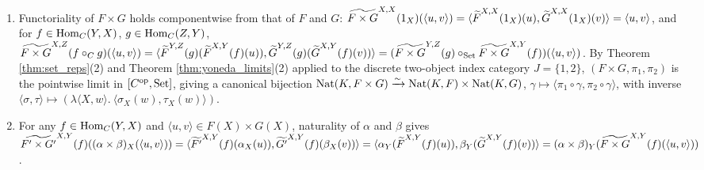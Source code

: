 \documentclass[10pt,a4paper]{article}
\begin{document}
\begin{enumerate}
\item Functoriality of $F \times G$ holds componentwise from that of $F$ and $G$: $\widetilde{F \times G}^{X,X}(1_X)(\langle u, v \rangle) = \langle {\widetilde{F}\textrm{}}^{X,X}(1_X)(u), {\widetilde{G}\textrm{}}^{X,X}(1_X)(v) \rangle = \langle u, v \rangle$, and for $f \in {\textrm{Hom}}_C(Y, X)$, $g \in {\textrm{Hom}}_C(Z, Y)$, $\widetilde{F \times G}^{X,Z}(f \circ_C g)(\langle u, v \rangle) = \langle {\widetilde{F}\textrm{}}^{Y,Z}(g)({\widetilde{F}\textrm{}}^{X,Y}(f)(u)), {\widetilde{G}\textrm{}}^{Y,Z}(g)({\widetilde{G}\textrm{}}^{X,Y}(f)(v)) \rangle = (\widetilde{F \times G}^{Y,Z}(g) \circ_{\textrm{Set}} \widetilde{F \times G}^{X,Y}(f))(\langle u, v \rangle)$. By Theorem \ref{thm:set_reps}(2) and Theorem \ref{thm:yoneda_limits}(2) applied to the discrete two-object index category $J = \{1, 2\}$, $(F \times G, \pi_1, \pi_2)$ is the pointwise limit in $[C^{\textrm{op}}, {\textrm{Set}}]$, giving a canonical bijection ${\textrm{Nat}}(K, F \times G) \xrightarrow{\sim} {\textrm{Nat}}(K, F) \times {\textrm{Nat}}(K, G)$, $\gamma \mapsto \langle \pi_1 \circ \gamma, \pi_2 \circ \gamma \rangle$, with inverse $\langle \sigma, \tau \rangle \mapsto (\lambda \langle X, w \rangle.\ \langle \sigma_X(w), \tau_X(w) \rangle)$.
\item For any $f \in {\textrm{Hom}}_C(Y, X)$ and $\langle u, v \rangle \in F(X) \times G(X)$, naturality of $\alpha$ and $\beta$ gives $\widetilde{F' \times G'}^{X,Y}(f)((\alpha \times \beta)_X(\langle u, v \rangle)) = \langle \widetilde{F'}^{X,Y}(f)(\alpha_X(u)), \widetilde{G'}^{X,Y}(f)(\beta_X(v)) \rangle = \langle \alpha_Y({\widetilde{F}\textrm{}}^{X,Y}(f)(u)), \beta_Y({\widetilde{G}\textrm{}}^{X,Y}(f)(v)) \rangle = (\alpha \times \beta)_Y(\widetilde{F \times G}^{X,Y}(f)(\langle u, v \rangle))$.
\end{enumerate}
\myqed
\end{document}
